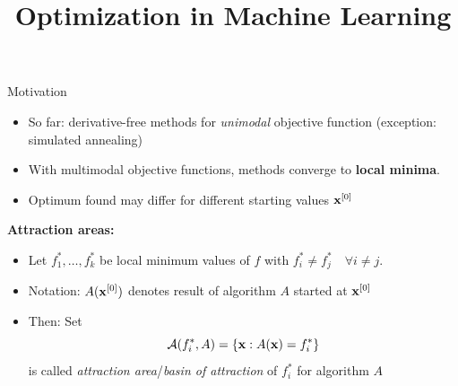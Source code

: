 \documentclass[11pt,compress,t,notes=noshow, xcolor=table]{beamer}
\title{Optimization in Machine Learning}
\date{}
\begin{document}
\sloppy


\begin{vbframe}{Motivation}
\begin{itemize}
\item So far: derivative-free methods for \textit{unimodal} objective function (exception: simulated annealing)
\item With multimodal objective functions, methods converge to \textbf{local minima}.
\item Optimum found may differ for different starting values $\mathbf{x}^{[0]}$
\end{itemize}

\medskip

\textbf{Attraction areas:}
\begin{itemize}
    \item Let $f_1^*, \ldots, f_k^*$ be local minimum values of $f$ with $f_i^* \neq f_j^* \quad \forall i \neq j$.
    \item Notation: $A(\mathbf{x}^{[0]})$ denotes result of algorithm $A$ started at $\mathbf{x}^{[0]}$
    \item Then: Set
        \begin{equation*}
            \mathcal{A}(f_i^*, A) = \left\{ \mathbf{x} : A(\mathbf{x}) = f_i^*\right\}
        \end{equation*}
        is called \textit{attraction area}/\textit{basin of attraction} of $f_i^*$ for algorithm $A$
\end{itemize}
\end{vbframe}
\end{document}
